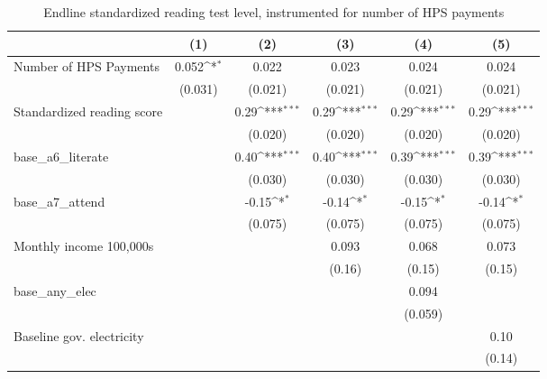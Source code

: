 \begin{table}[htbp]\centering
\def\sym#1{\ifmmode^{#1}\else\(^{#1}\)\fi}
\caption{Endline standardized reading test level, instrumented for number of HPS payments}
\begin{tabular*}{1\hsize}{@{\hskip\tabcolsep\extracolsep\fill}l*{5}{c}}
\toprule
                &\multicolumn{1}{c}{(1)}         &\multicolumn{1}{c}{(2)}         &\multicolumn{1}{c}{(3)}         &\multicolumn{1}{c}{(4)}         &\multicolumn{1}{c}{(5)}         \\
\midrule
Number of HPS Payments&    0.052\sym{*}  &    0.022         &    0.023         &    0.024         &    0.024         \\
                &  (0.031)         &  (0.021)         &  (0.021)         &  (0.021)         &  (0.021)         \\
Standardized reading score&                  &     0.29\sym{***}&     0.29\sym{***}&     0.29\sym{***}&     0.29\sym{***}\\
                &                  &  (0.020)         &  (0.020)         &  (0.020)         &  (0.020)         \\
base\_a6\_literate&                  &     0.40\sym{***}&     0.40\sym{***}&     0.39\sym{***}&     0.39\sym{***}\\
                &                  &  (0.030)         &  (0.030)         &  (0.030)         &  (0.030)         \\
base\_a7\_attend  &                  &    -0.15\sym{*}  &    -0.14\sym{*}  &    -0.15\sym{*}  &    -0.14\sym{*}  \\
                &                  &  (0.075)         &  (0.075)         &  (0.075)         &  (0.075)         \\
Monthly income 100,000s&                  &                  &    0.093         &    0.068         &    0.073         \\
                &                  &                  &   (0.16)         &   (0.15)         &   (0.15)         \\
base\_any\_elec   &                  &                  &                  &    0.094         &                  \\
                &                  &                  &                  &  (0.059)         &                  \\
Baseline gov. electricity&                  &                  &                  &                  &     0.10         \\
                &                  &                  &                  &                  &   (0.14)         \\

\end{tabular*}
\end{table}
